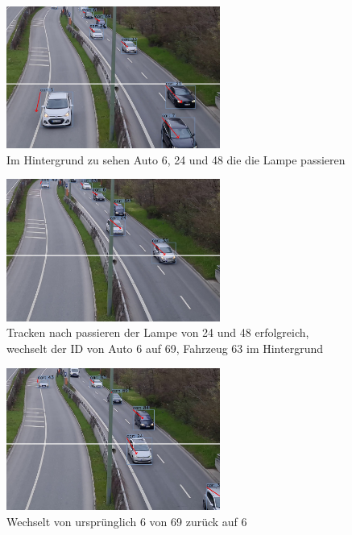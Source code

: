 \documentclass[conference]{IEEEtran}
\begin{document}
	\begin{figure}[!h]
		\begin{center}
			\includegraphics[width=7cm]{Media/switch1.jpg}
			\caption{Im Hintergrund zu sehen Auto 6, 24 und 48 die die Lampe passieren}
			\label{track3}
		\end{center}
	\end{figure}
	\begin{figure}[!h]
		\begin{center}
			\includegraphics[width=7cm]{Media/switch2.jpg}
			\caption{Tracken nach passieren der Lampe von 24 und 48 erfolgreich, wechselt der ID von Auto 6 auf 69, Fahrzeug 63 im Hintergrund}
			\label{track4}
		\end{center}
	\end{figure}
	\begin{figure}[!h]
		\begin{center}
			\includegraphics[width=7cm]{Media/switch3.jpg}
			\caption{Wechselt von ursprünglich 6 von 69 zurück auf 6 }
			\label{track5}
		\end{center}
	\end{figure}
\end{document}
